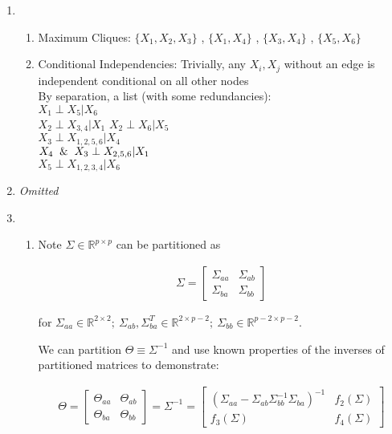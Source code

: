 \documentclass[11pt]{article}
\begin{document}
\begin{enumerate}
\item 
    \begin{enumerate}[label=(\alph*)]
        \item Maximum Cliques:
        $\{X_1, X_2, X_3\}$
        , $\{X_1, X_4 \}$
        , $\{X_3, X_4 \}$
        , $\{X_5, X_6 \}$
        \item Conditional Independencies:
        Trivially, any $X_i, X_j$ without an edge is independent conditional on all other nodes\\ 
        By separation, a list (with some redundancies): \\  
        $X_1 \perp X_5 | X_6$ \\         
        $X_2 \perp X_{3,4} | X_1$
        $X_2 \perp X_6 | X_5$ \\ 
        $X_3 \perp X_{1, 2,5,6} | X_4$ \\
        $X_4 \And X_3 \perp X_{2,5,6} | X_1$ \\
        $X_5 \perp X_{1,2,3,4} | X_6$        
    \end{enumerate}

    
\item {\it Omitted }

\item 
    \begin{enumerate}[label=(\alph*)]
        \item 
        Note $\Sigma \in \mathbb{R}^{p \times p}$ can be partitioned as 
        
        \begin{align*}
            \Sigma = 
            \begin{bmatrix}
            \Sigma_{aa} & \Sigma_{ab} \\ 
            \Sigma_{ba} & \Sigma_{bb}
            \end{bmatrix}
        \end{align*}
        
        for $\Sigma_{aa} \in \mathbb{R}^{2 \times 2}; \ \Sigma_{ab}, \Sigma_{ba}^T \in \mathbb{R}^{2 \times p-2}; \ \Sigma_{bb} \in \mathbb{R}^{p-2 \times p-2}$. 
        
        We can partition $\Theta \equiv \Sigma^{-1}$ and use known properties of the inverses of partitioned matrices to demonstrate:
        
        \begin{gather*}
                \Theta 
                =
            \begin{bmatrix}
                \Theta_{aa} & \Theta_{ab} \\ 
                \Theta_{ba} & \Theta_{bb}
            \end{bmatrix}
                = 
                \Sigma^{-1}
                =
            \begin{bmatrix}
                \left( \Sigma_{aa} - \Sigma_{ab}\Sigma_{bb}^{-1}\Sigma_{ba} \right)^{-1} & f_2\left(\Sigma \right) \\ 
                f_3\left(\Sigma \right) & f_4\left(\Sigma \right)
            \end{bmatrix}
        \end{gather*}
        

\end{enumerate}
\end{enumerate}
\end{document}

